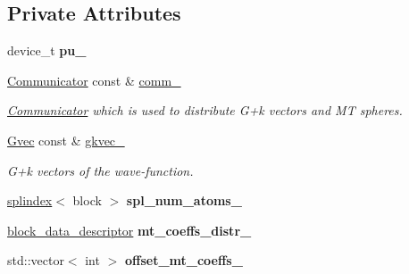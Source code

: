 \subsection*{Private Attributes}
\begin{DoxyCompactItemize}
\item 
\hypertarget{classsddk_1_1wave__functions_a8b89b1db49ac40ceca249a2414bc77d7}{}device\+\_\+t {\bfseries pu\+\_\+}\label{classsddk_1_1wave__functions_a8b89b1db49ac40ceca249a2414bc77d7}

\item 
\hyperlink{classsddk_1_1_communicator}{Communicator} const \& \hyperlink{classsddk_1_1wave__functions_a6da39d163a57536020b4efc9c37e6c67}{comm\+\_\+}
\begin{DoxyCompactList}\small\item\em \hyperlink{classsddk_1_1_communicator}{Communicator} which is used to distribute G+k vectors and M\+T spheres. \end{DoxyCompactList}\item 
\hyperlink{classsddk_1_1_gvec}{Gvec} const \& \hyperlink{classsddk_1_1wave__functions_afe88ae4a135d1476e3a1a8e7f1b1f4bd}{gkvec\+\_\+}
\begin{DoxyCompactList}\small\item\em G+k vectors of the wave-\/function. \end{DoxyCompactList}\item 
\hypertarget{classsddk_1_1wave__functions_aa16e3d06d3caad2fa5facf4d80ce8210}{}\hyperlink{classsddk_1_1splindex}{splindex}$<$ block $>$ {\bfseries spl\+\_\+num\+\_\+atoms\+\_\+}\label{classsddk_1_1wave__functions_aa16e3d06d3caad2fa5facf4d80ce8210}

\item 
\hypertarget{classsddk_1_1wave__functions_a4a960d70b123946b8ce9d8f39ac29038}{}\hyperlink{structsddk_1_1block__data__descriptor}{block\+\_\+data\+\_\+descriptor} {\bfseries mt\+\_\+coeffs\+\_\+distr\+\_\+}\label{classsddk_1_1wave__functions_a4a960d70b123946b8ce9d8f39ac29038}

\item 
\hypertarget{classsddk_1_1wave__functions_a1373e38e173d9db5ab252c74ffeff6eb}{}std\+::vector$<$ int $>$ {\bfseries offset\+\_\+mt\+\_\+coeffs\+\_\+}\label{classsddk_1_1wave__functions_a1373e38e173d9db5ab252c74ffeff6eb}


\end{DoxyCompactItemize}
